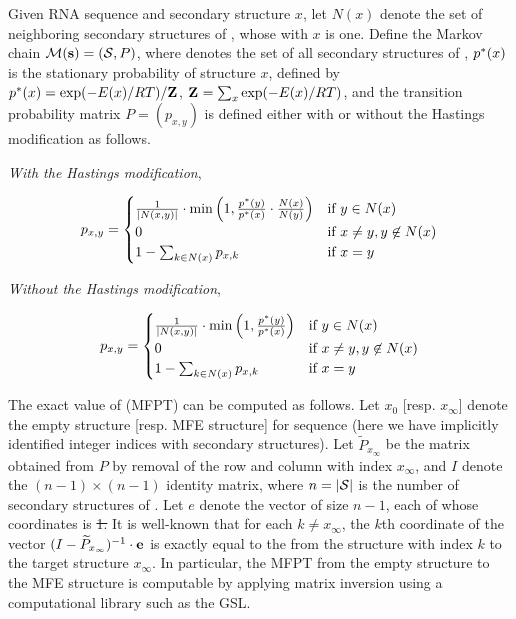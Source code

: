 \documentclass[11pt, oneside]{Thesis} %
\providecommand{\DIFadd}[1]{{\protect\color{blue}\uwave{#1}}} %
\providecommand{\DIFdel}[1]{{\protect\color{red}\sout{#1}}}                      %
\providecommand{\DIFaddbegin}{} %
\providecommand{\DIFaddend}{} %
\providecommand{\DIFdelbegin}{} %
\providecommand{\DIFdelend}{} %
\begin{document}
Given RNA sequence \seq and secondary structure $x$,
let $N(x)$ denote the set of neighboring secondary structures of
\seq, whose \bpd with $x$ is one. Define the Markov
chain $\mathcal{M}({\bf s})=(\mathcal S,P)$, where \str denotes the
set of all secondary structures of \seq, $p^*(x)$ is the stationary
probability of structure $x$, defined by $p^*(x)=\exp(-E(x)/RT)/{\bf Z}^{}_{}$,
${\bf Z}^{}_{}=\sum_{x} \exp(-E(x)/RT)$, and the transition probability matrix $P
= (p_{x,y})$ is defined either with or without the Hastings
modification as follows.

{\em With the Hastings modification},

\begin{align}
\label{eq:hermes:xitionProbWithHastings}
p_{x,y}=
\begin{cases}
\frac{1}{|N(x,y)|} \cdot \min\left(1, \frac{\pSt(y)}{\pSt(x)} \cdot
\frac{N(x)}{N(y)}\right) & \text{if $y \in N(x)$} \\
0 &\text{if $x \ne y, y \not\in N(x)$} \\
1 - \sum_{k \in N(x)} p_{x,k} & \text{if $x=y$} \\
\end{cases}
\end{align}

{\em Without the Hastings modification},

\begin{align}
\label{eq:hermes:xitionProbWithoutHastings}
p_{x,y}=
\begin{cases}
\frac{1}{|N(x,y)|} \cdot \min\left(1, \frac{\pSt(y)}{\pSt(x)}\right)
& \text{if $y \in N(x)$} \\
0 &\text{if $x \ne y, y \not\in N(x)$} \\
1 - \sum_{k \in N(x)} p_{x,k} & \text{if $x=y$} \\
\end{cases}
\end{align}

The exact value of \mfpt (MFPT) can be computed as
follows. Let $x_0$ [resp. $x_{\infty}$] denote the empty structure
[resp. MFE structure] for sequence \seq (here we have implicitly
identified integer indices with secondary structures). Let
$\widetilde{P}_{x_{\infty}}$ be the matrix obtained from $P$ by
removal of the row and column with index $x_{\infty}$, and $I$ denote
the $(n-1)\times(n-1)$ identity matrix, where $n=|\mathcal S|$ is the
number of secondary structures of \seq. Let $e$ denote the vector of
size $n-1$, each of whose coordinates is \DIFdelbegin \DIFdel{1. }\DIFdelend \DIFaddbegin \DIFadd{$1$. }\DIFaddend It is well-known
\citep{meyermfpt} that for each $k\ne x_{\infty}$, the $k$th coordinate
of the vector $(I - \widetilde{P}_{x_{\infty}})^{-1} \cdot {\bf e}$ is
exactly equal to the \mfpt from the structure with
index $k$ to the target structure $x_{\infty}$. In particular, the
MFPT from the empty structure to the MFE structure is computable by
applying matrix inversion using a computational library such as the GSL.
\end{document}
